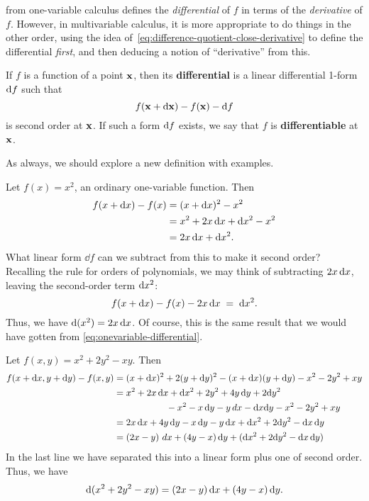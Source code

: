 \documentclass[12pt]{amsart}
\begin{document}
 from one-variable calculus defines the \emph{differential} of $f$ in terms of the \emph{derivative} of $f$.
However, in multivariable calculus, it is more appropriate to do things in the other order, using the idea of~\cref{eq:difference-quotient-close-derivative} to define the differential \emph{first}, and then deducing a notion of ``derivative'' from this.

\begin{defn}\label{def:differential}
  If $f$ is a function of a point $\mathbf{x}$, then its \textbf{differential} is a linear differential 1-form $\mathrm{d} f$ such that
  \[ f(\mathbf{x} + \mathrm{d}\mathbf{x}) - f(\mathbf{x}) - \mathrm{d} f \]
  is second order at $\mathbf{x}$.
  If such a form $\mathrm{d} f$ exists, we say that $f$ is \textbf{differentiable} at $\mathbf{x}$.
\end{defn}

As always, we should explore a new definition with examples.

\begin{eg}
  Let $f(x) = x^2$, an ordinary one-variable function.
  Then
  \begin{align*}
    f(x + \mathrm{d} x) - f(x) &= (x+\mathrm{d} x)^2 - x^2\\
    &= x^2 + 2 x \, \mathrm{d} x + \mathrm{d} x^2 - x^2\\
    &= 2x \, \mathrm{d} x + \mathrm{d} x ^2.
  \end{align*}
  What linear form $\dd f$ can we subtract from this to make it second order?
  Recalling the rule for orders of polynomials, we may think of subtracting $2x \, \mathrm{d} x$, leaving the second-order term $\mathrm{d} x^2$:
  \[ f(x + \mathrm{d} x) - f(x) - 2x \, \mathrm{d} x \;=\; \mathrm{d} x^2. \]
  Thus, we have $\mathrm{d}(x^2) = 2 x \, \mathrm{d} x$.
  Of course, this is the same result that we would have gotten from \cref{eq:onevariable-differential}.
\end{eg}

\begin{eg}
  Let $f(x,y) = x^2 + 2y^2 - xy$.
  Then
  \begin{align*}
    f(x+\mathrm{d} x,y+\mathrm{d} y) - f(x,y)
    &= (x+\mathrm{d} x)^2 + 2(y+\mathrm{d} y)^2 - (x+\mathrm{d} x)(y+\mathrm{d} y) - x^2 - 2y^2 + xy\\
    &= x^2 + 2 x \, \mathrm{d} x + \mathrm{d} x^2 + 2y^2 + 4y\,\mathrm{d} y + 2\mathrm{d} y^2\\
    & \hspace{2cm} - x^2 - x \, \mathrm{d} y - y \, dx - \mathrm{d} x \mathrm{d} y - x^2 - 2y^2 + xy\\
    &= 2x\,\mathrm{d} x + 4y\,\mathrm{d} y - x\,\mathrm{d} y - y\,\mathrm{d} x + \mathrm{d} x^2 + 2\mathrm{d} y^2 - \mathrm{d} x\,\mathrm{d} y\\
    &= (2x-y)\,\,dx + (4y-x)\,\mathrm{d} y + (\mathrm{d} x^2 + 2\mathrm{d} y^2 - \mathrm{d} x\,\mathrm{d} y)
  \end{align*}
  In the last line we have separated this into a linear form plus one of second order.
  Thus, we have
  \[ \mathrm{d}(x^2 + 2y^2 - xy) = (2x-y)\,\mathrm{d} x + (4y-x)\,\mathrm{d} y .\]
\end{eg}
\end{document}
